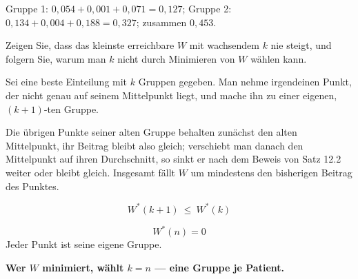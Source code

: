 \begin{aufgabe}
 Gruppe 1: $0{,}054+0{,}001+0{,}071 = 0{,}127$; Gruppe 2: $0{,}134+0{,}004+0{,}188 = 0{,}327$; zusammen $0{,}453$.

\begin{center}
\begin{minipage}{0.88\textwidth}
\end{minipage}
\end{center}
\end{aufgabe}

\begin{aufgabe}
Zeigen Sie, dass das kleinste erreichbare $W$ mit wachsendem $k$ nie steigt, und folgern Sie, warum man $k$ nicht durch Minimieren von $W$ wählen kann.

\loesung
{}
Sei eine beste Einteilung mit $k$ Gruppen gegeben. Man nehme irgendeinen Punkt, der nicht genau auf seinem Mittelpunkt liegt, und mache ihn zu einer eigenen, $(k+1)$-ten Gruppe.

 Die übrigen Punkte seiner alten Gruppe behalten zunächst den alten Mittelpunkt, ihr Beitrag bleibt also gleich; verschiebt man danach den Mittelpunkt auf ihren Durchschnitt, so sinkt er nach dem Beweis von Satz 12.2 weiter oder bleibt gleich. Insgesamt fällt $W$ um mindestens den bisherigen Beitrag des Punktes.

\[ W^{*}(k+1) \ \le\ W^{*}(k) \]

\[ W^{*}(n) = 0 \]
Jeder Punkt ist seine eigene Gruppe.

\begin{center}
\begin{minipage}{0.9\textwidth}
\textbf{Wer $W$ minimiert, wählt $k = n$ --- eine Gruppe je Patient.}
\end{minipage}
\end{center}

\begin{center}
\begin{minipage}{0.88\textwidth}
\end{minipage}
\end{center}


\end{aufgabe}
